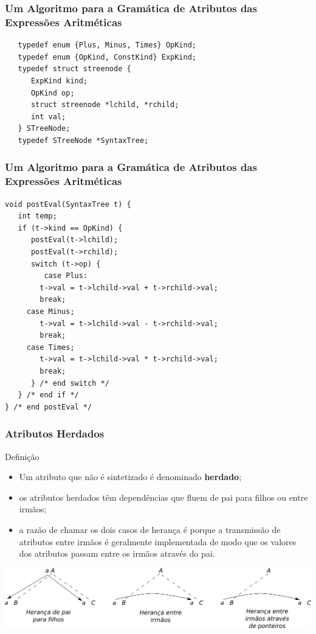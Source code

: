 \documentclass[table]{beamer}
\begin{document}
\begin{frame}[fragile]
   \frametitle{Um Algoritmo para a Gramática de Atributos das Expressões Aritméticas}
   \begin{verbatim}
   typedef enum {Plus, Minus, Times} OpKind;
   typedef enum {OpKind, ConstKind} ExpKind;
   typedef struct streenode {
      ExpKind kind;
      OpKind op;
      struct streenode *lchild, *rchild;
      int val;
   } STreeNode;
   typedef STreeNode *SyntaxTree;
   \end{verbatim}
\end{frame}

\begin{frame}[fragile]
   \frametitle{Um Algoritmo para a Gramática de Atributos das Expressões Aritméticas}
   \small
   \begin{verbatim}
void postEval(SyntaxTree t) {
   int temp;
   if (t->kind == OpKind) {
      postEval(t->lchild);
      postEval(t->rchild);
      switch (t->op) {
         case Plus:
	    t->val = t->lchild->val + t->rchild->val;
	    break;
	 case Minus;
	    t->val = t->lchild->val - t->rchild->val;
	    break;
	 case Times;
	    t->val = t->lchild->val * t->rchild->val;
	    break;
      } /* end switch */
   } /* end if */
} /* end postEval */
   \end{verbatim}
\end{frame}

\begin{frame}
   \frametitle{Atributos Herdados}
   \begin{block}{Definição}
   \begin{itemize}
      \item Um atributo que não é sintetizado é denominado \textbf{herdado};
      \item os atributos herdados têm dependências que fluem de pai para filhos ou entre irmãos;
      \item a razão de chamar os dois casos de herança é porque a transmissão de atributos entre irmãos é geralmente implementada de modo que os valores dos atributos passam entre os irmãos através do pai.
   \end{itemize}
   \end{block}
   \includegraphics[width=\linewidth,height=\textheight,keepaspectratio]{figuras/exemplo69.png}
\end{frame}
\end{document}
